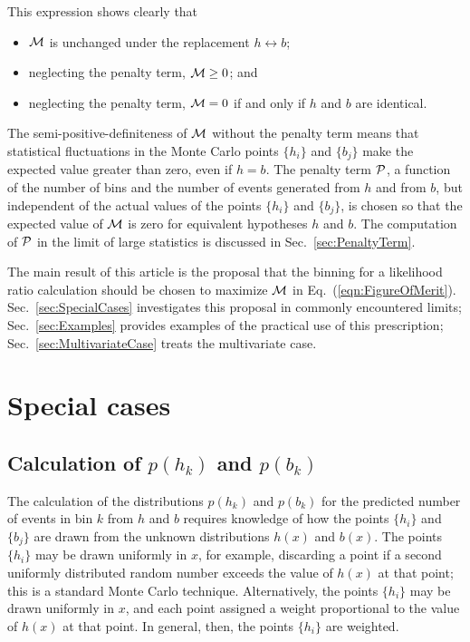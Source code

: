\documentclass[twocolumn,twoside,prd]{revtex4} %
\begin{document}
This expression shows clearly that
\begin{itemize}
\item ${\cal M}$ is unchanged under the replacement $h \leftrightarrow b$;
\item neglecting the penalty term, ${\cal M} \geq 0$; and
\item neglecting the penalty term, ${\cal M} = 0$ if and only if $h$ and $b$ are identical.
\end{itemize}
The semi-positive-definiteness of ${\cal M}$ without the penalty term means that statistical fluctuations in the Monte Carlo points $\{ h_i \}$ and $\{ b_j \}$ make the expected value greater than zero, even if $h=b$.  The penalty term ${\cal P}$, a function of the number of bins and the number of events generated from $h$ and from $b$, but independent of the actual values of the points $\{ h_i \}$ and $\{ b_j \}$, is chosen so that the expected value of ${\cal M}$ is zero for equivalent hypotheses $h$ and $b$.  The computation of ${\cal P}$ in the limit of large statistics is discussed in Sec.~\ref{sec:PenaltyTerm}.

The main result of this article is the proposal that the binning for a likelihood ratio calculation should be chosen to maximize ${\cal M}$ in Eq.~(\ref{eqn:FigureOfMerit}).  Sec.~\ref{sec:SpecialCases} investigates this proposal in commonly encountered limits; Sec.~\ref{sec:Examples} provides examples of the practical use of this prescription; Sec.~\ref{sec:MultivariateCase} treats the multivariate case.


\section{\label{sec:SpecialCases}Special cases}

\subsection{Calculation of $p(h_k)$ and $p(b_k)$}

The calculation of the distributions $p(h_k)$ and $p(b_k)$ for the predicted number of events in bin $k$ from $h$ and $b$ requires knowledge of how the points $\{ h_i \}$ and $\{ b_j \}$ are drawn from the unknown distributions $h(x)$ and $b(x)$.  The points $\{ h_i \}$ may be drawn uniformly in $x$, for example, discarding a point if a second uniformly distributed random number exceeds the value of $h(x)$ at that point; this is a standard Monte Carlo technique.  Alternatively, the points $\{ h_i \}$ may be drawn uniformly in $x$, and each point assigned a weight proportional to the value of $h(x)$ at that point.  In general, then, the points $\{ h_i \}$ are weighted.
\end{document}
